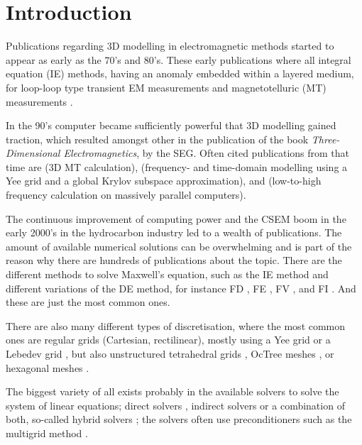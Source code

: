 \documentclass[
    paper,
  ]{geophysics}
\begin{document}
\section{Introduction}

Publications regarding 3D modelling in electromagnetic methods started to
appear as early as the 70's and 80's. These early publications where all
integral equation (IE) methods, having an anomaly embedded within a layered
medium, for loop-loop type transient EM measurements \citep{GJI.74.Raiche,
GEO.75.Hohmann, GJI.82.Das, GEO.86.Newman} and magnetotelluric (MT)
measurements \citep{GEO.84.Wannamaker}.

In the 90's computer became sufficiently powerful that 3D modelling gained
traction, which resulted amongst other in the publication of the book
\emph{Three-Dimensional Electromagnetics}, \cite{B.SEG.99.Oristaglio} by the
SEG. Often cited publications from that time are \cite{RSC.94.Mackie} (3D MT
calculation), \cite{RS.94.Druskin} (frequency- and time-domain modelling using
a Yee grid and a global Krylov subspace approximation), and
\cite{RS.96.Alumbaugh, GJI.97.Newman} (low-to-high frequency calculation on
massively parallel computers).

The continuous improvement of computing power and the CSEM boom in the early
2000's in the hydrocarbon industry led to a wealth of publications. The amount
of available numerical solutions can be overwhelming and is part of the reason
why there are hundreds of publications about the topic. There are the different
methods to solve Maxwell's equation, such as the IE method
\citep{GJI.74.Raiche, RS.02.Hursan, GEO.06.Zhdanov, GP.10.Tehrani,
CAG.16.Kruglyakov, MGS.17.Kruglyakov} and different variations of the DE
method, for instance FD \citep{IEEE.66.Yee, RSC.94.Mackie, RS.94.Druskin,
GEO.09.Streich, CAG.13.Sommer}, FE \citep{GJI.11.Schwarzbach, GEO.12.daSilva,
GJI.13.Puzyrev, GJI.13.Grayver, SEG.16.Zhang}, FV \citep{EM.90.Madsen,
ECP.07.Haber, GEO.14.Jahandari}, and FI \citep{PIER.01.Clemens, GP.06.Mulder}.
And these are just the most common ones.

There are also many different types of discretisation, where the most common
ones are regular grids (Cartesian, rectilinear), mostly using a Yee grid
\citep{IEEE.66.Yee} or a Lebedev grid \citep{CMMP.64.Lebedev}, but also
unstructured tetrahedral grids \citep{SEG.16.Zhang, CAG.17.Cai}, OcTree meshes
\citep{ECP.07.Haber}, or hexagonal meshes \citep{CAG.14.Cai}.

The biggest variety of all exists probably in the available solvers to solve
the system of linear equations; direct solvers \citep{GEO.09.Streich,
GEO.15.Grayver, GP.14.Chung, GEO.14.Jaysaval, SEG.15.Oh, GJI.18.Wang}, indirect
solvers \citep{GP.06.Mulder, GJI.15.Jaysaval} or a combination of both,
so-called hybrid solvers \citep{GEO.18.Liu}; the solvers often use
preconditioners such as the multigrid method \citep{SIAM.02.Aruliah,
GP.06.Mulder, GJI.16.Jaysaval}.
\end{document}
